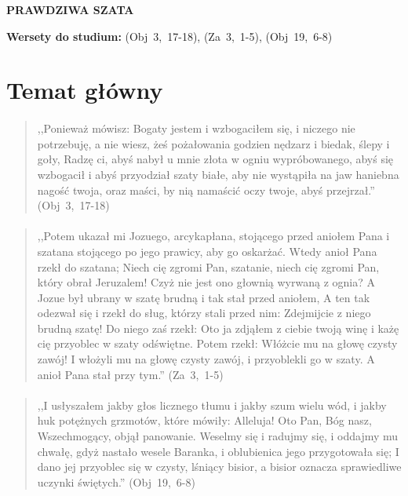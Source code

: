 \documentclass[10pt,a4paper,oneside]{article}
\begin{document}
\centerline{\textbf{\MakeUppercase{Prawdziwa szata}}}
\begin{center}
\textbf{Wersety do studium:} \mbox{(Obj 3, 17-18)}, \mbox{(Za 3, 1-5)}, \mbox{(Obj 19, 6-8)}
\end{center}
\section{Temat główny}
\paragraph{}
\begin{quote}
,,Ponieważ mówisz: Bogaty jestem i wzbogaciłem się, i niczego nie potrzebuję, a nie wiesz, żeś pożałowania godzien nędzarz i biedak, ślepy i goły, Radzę ci, abyś nabył u mnie złota w ogniu wypróbowanego, abyś się wzbogacił i abyś przyodział szaty białe, aby nie wystąpiła na jaw haniebna nagość twoja, oraz maści, by nią namaścić oczy twoje, abyś przejrzał.'' \mbox{(Obj 3, 17-18)}
\end{quote}
\paragraph{}
\begin{quote}
,,Potem ukazał mi Jozuego, arcykapłana, stojącego przed aniołem Pana i szatana stojącego po jego prawicy, aby go oskarżać. Wtedy anioł Pana rzekł do szatana; Niech cię zgromi Pan, szatanie, niech cię zgromi Pan, który obrał Jeruzalem! Czyż nie jest ono głownią wyrwaną z ognia? A Jozue był ubrany w szatę brudną i tak stał przed aniołem, A ten tak odezwał się i rzekł do sług, którzy stali przed nim: Zdejmijcie z niego brudną szatę! Do niego zaś rzekł: Oto ja zdjąłem z ciebie twoją winę i każę cię przyoblec w szaty odświętne. Potem rzekł: Włóżcie mu na głowę czysty zawój! I włożyli mu na głowę czysty zawój, i przyoblekli go w szaty. A anioł Pana stał przy tym.'' \mbox{(Za 3, 1-5)}
\end{quote}
\paragraph{}
\begin{quote}
,,I usłyszałem jakby głos licznego tłumu i jakby szum wielu wód, i jakby huk potężnych grzmotów, które mówiły: Alleluja! Oto Pan, Bóg nasz, Wszechmogący, objął panowanie. Weselmy się i radujmy się, i oddajmy mu chwałę, gdyż nastało wesele Baranka, i oblubienica jego przygotowała się; I dano jej przyoblec się w czysty, lśniący bisior, a bisior oznacza sprawiedliwe uczynki świętych.'' \mbox{(Obj 19, 6-8)}
\end{quote}
\end{document}
